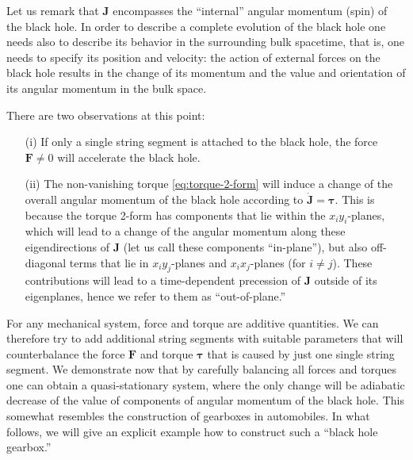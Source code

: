 \documentclass[superscriptaddress,twocolumn,showpacs,
preprintnumbers,amsmath,amssymb,nofootinbib,
longbibliography,aps,prd,10pt]{revtex4-1}
\newcommand{\ts}[1]{{\boldsymbol{#1}}}         %
\begin{document}
Let us remark that $\ts{J}$ encompasses the ``internal'' angular momentum (spin) of the black hole. In order to describe a complete evolution of the black hole one needs also to describe its behavior in the surrounding bulk spacetime, that is, one needs to specify its position and velocity: the action of external forces on the black hole results in the change of its momentum and the value and orientation of its angular momentum in the bulk space.

There are two observations at this point:
\begin{itemize}
\item[(i)] If only a single string segment is attached to the black hole, the force $\ts{F} \not=0$ will accelerate the black hole.
\item[(ii)] The non-vanishing torque \eqref{eq:torque-2-form} will induce a change of the overall angular momentum of the black hole according to $\dot{\ts{J}} = \ts{\tau}$. This is because the torque 2-form has components that lie within the $x_iy_i$-planes, which will lead to a change of the angular momentum along these eigendirections of $\ts{J}$ (let us call these components ``in-plane''), but also off-diagonal terms that lie in $x_iy_j$-planes and $x_ix_j$-planes (for $i \not= j$). These contributions will lead to a time-dependent precession of $\ts{J}$ outside of its eigenplanes, hence we refer to them as ``out-of-plane.''
\end{itemize}
For any mechanical system, force and torque are additive quantities. We can therefore try to add additional string segments with suitable parameters that will counterbalance the force $\ts{F}$ and torque $\ts{\tau}$ that is caused by just one single string segment. We demonstrate now that by carefully balancing all forces and torques one can obtain  a quasi-stationary system, where the only change will be adiabatic decrease of the value of components of angular  momentum of the black hole. This somewhat resembles the construction of gearboxes in automobiles. In what follows, we will give an explicit example how to construct such a ``black hole gearbox.''
\end{document}
